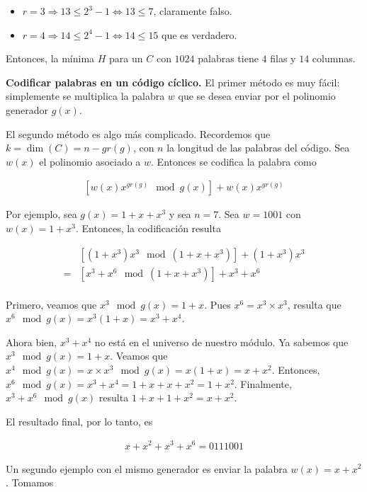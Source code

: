 \documentclass[a4paper]{article}
\begin{document}
\begin{itemize}
    \item $r = 3 \Rightarrow 13 \leq 2^3 - 1 \iff 13 \leq 7$, claramente falso.
    \item $r = 4 \Rightarrow 14 \leq 2^4 - 1 \iff 14 \leq 15$ que es verdadero.
\end{itemize}

Entonces, la mínima $H$ para un $C$ con $1024$ palabras tiene $4$ filas y $14$ columnas.

\textbf{Codificar palabras en un código cíclico.} El primer método es muy fácil:
simplemente se multiplica la palabra $w$ que se desea enviar por el polinomio
generador $g(x)$. 

El segundo método es algo más complicado. Recordemos que $k = \dim(C) = n -
gr(g)$, con $n$ la longitud de las palabras del código. Sea $w(x)$ el polinomio
asociado a $w$. Entonces se codifica la palabra como 

\begin{align*}
    \left[w(x) x^{gr(g)} \mod g(x)\right] + w(x) x^{gr(g)}
\end{align*}

Por ejemplo, sea $g(x) = 1 + x + x^3$ y sea $n = 7$. Sea $w = 1001$ con $w(x) =
1 + x^3$. Entonces, la codificación resulta 

\begin{align*}
    &\left[(1+x^3)x^3 \mod (1 + x + x^3)\right] + (1+x^3)x^3 \\ 
    =&\left[x^3 + x^6 \mod (1 + x + x^3)\right] + x^3 + x^6 \\ 
\end{align*}

Primero, veamos que $x^3 \mod g(x) = 1 + x$. Pues $x^6 = x^3 \times x^3$,
resulta que $x^6 \mod g(x) = x^3 \left( 1 + x \right)  = x^3 + x^4$. 

Ahora bien, $x^3 + x^4$
no está en el universo de nuestro módulo. Ya sabemos que $x^3 \mod g(x) = 1 +
x$. Veamos que $x^4 \mod g(x) = x \times x^3
\mod g(x) = x(1 + x) = x + x^2$.  Entonces, $x^6 \mod g(x) = x^3 + x^4 = 1 + x +
x + x^2 = 1 + x^2$. Finalmente, $x^3 + x^6
\mod g(x)$ resulta $1 + x + 1 + x^2 = x + x^2$.

El resultado final, por lo tanto, es 

\begin{align*}
    x + x^2 + x^3 + x^6 = 0111001
\end{align*}

Un segundo ejemplo con el mismo generador es enviar la palabra $w(x) = x + x^2$.
Tomamos 
\end{document}
